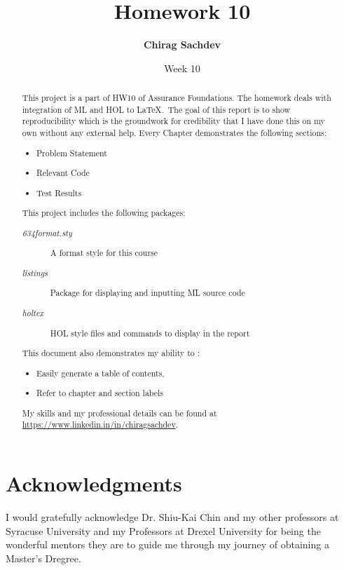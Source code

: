 \documentclass{report}
\title{Homework 10}
\author{\textbf{Chirag Sachdev}}
\date{Week 10}
\begin{document}
\lstset{language=ML, breaklines=true, basicstyle=\small}
\maketitle{}

\begin{abstract}
This project is a part of HW10 of Assurance Foundations. The homework deals with integration of ML and HOL to \LaTeX.\ The goal of this report is to show reproducibility which is the groundwork for credibility that I have done this on my own without any external help. Every Chapter demonstrates the following sections:
	\begin{itemize}
		\item Problem Statement
		\item Relevant Code
		\item Test Results
	\end{itemize}
	
This project includes the following packages:
	\begin{description}
		\item[\emph{634format.sty}] A format style for this course
		\item[\emph{listings}] Package for displaying and inputting ML source code
		\item[\emph{holtex}] HOL style files and commands to display in the report
	\end{description}

This document also demonstrates my ability to :
	\begin{itemize}
		\item Easily generate a table of contents,
		\item Refer to chapter and section labels
	\end{itemize}

My skills and my professional details can be found at \url{https://www.linkedin.in/in/chiragsachdev}.
\end{abstract}

\section*{Acknowledgments}
I would gratefully acknowledge Dr. Shiu-Kai Chin and my other professors at Syracuse University and my Professors at Drexel University for being the wonderful mentors they are to guide me through my journey of obtaining a Master's Dregree.

\tableofcontents{}
\end{document}
